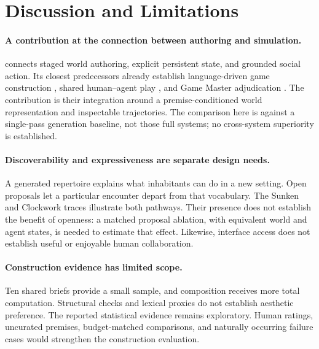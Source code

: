 \section{Discussion and Limitations}
\label{sec:discussion}

\paragraph{A contribution at the connection between authoring and simulation.}
\agora connects staged world authoring, explicit persistent state, and
grounded social action. Its closest predecessors already establish
language-driven game construction \cite{word2world,dreamgarden}, shared
human--agent play \cite{light}, and Game Master adjudication
\cite{vezhnevets2023}. The contribution is their integration around a
premise-conditioned world representation and inspectable trajectories.
The comparison here is against a single-pass generation baseline, not those
full systems; no cross-system superiority is established.

\paragraph{Discoverability and expressiveness are separate design needs.}
A generated repertoire explains what inhabitants can do in a new setting.
Open proposals let a particular encounter depart from that vocabulary.
The Sunken and Clockwork traces illustrate both pathways. Their presence
does not establish the benefit of openness: a matched proposal ablation,
with equivalent world and agent states, is needed to estimate that effect.
Likewise, interface access does not establish useful or enjoyable human
collaboration.

\paragraph{Construction evidence has limited scope.}
Ten shared briefs provide a small sample, and composition receives more total
computation. Structural checks and lexical proxies do not establish aesthetic
preference. The reported statistical evidence remains exploratory. Human
ratings, uncurated premises, budget-matched comparisons, and naturally
occurring failure cases would strengthen the construction evaluation.

